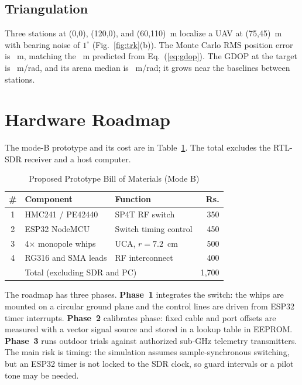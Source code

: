 \documentclass[conference]{IEEEtran}
\begin{document}
\subsection{Triangulation}
Three stations at (0,0), (120,0), and (60,110)~m localize a UAV at (75,45)~m with bearing noise of $1^\circ$ (Fig.~\ref{fig:trk}(b)). The Monte Carlo RMS position error is \trk~m, matching the \triTheory~m predicted from Eq.~(\ref{eq:gdop}). The GDOP at the target is \gdopT~m/rad, and its arena median is \gdopMed~m/rad; it grows near the baselines between stations.


\section{Hardware Roadmap}\label{sec:roadmap}
The mode-B prototype and its cost are in Table~\ref{tab:bom}. The total excludes the RTL-SDR receiver and a host computer.

\begin{table}[!t]
\caption{Proposed Prototype Bill of Materials (Mode B)}
\label{tab:bom}
\centering
\small
\begin{tabular}{@{}clp{3.4cm}r@{}}
\toprule
\# & Component & Function & Rs. \\
\midrule
1 & HMC241 / PE42440 & SP4T RF switch & 350 \\
2 & ESP32 NodeMCU & Switch timing control & 450 \\
3 & 4$\times$ monopole whips & UCA, $r=7.2$~cm & 500 \\
4 & RG316 and SMA leads & RF interconnect & 400 \\
\midrule
 & \multicolumn{2}{l}{Total (excluding SDR and PC)} & 1{,}700 \\
\bottomrule
\end{tabular}
\end{table}

The roadmap has three phases. \textbf{Phase~1} integrates the switch: the whips are mounted on a circular ground plane and the control lines are driven from ESP32 timer interrupts. \textbf{Phase~2} calibrates phase: fixed cable and port offsets are measured with a vector signal source and stored in a lookup table in EEPROM. \textbf{Phase~3} runs outdoor trials against authorized sub-GHz telemetry transmitters. The main risk is timing: the simulation assumes sample-synchronous switching, but an ESP32 timer is not locked to the SDR clock, so guard intervals or a pilot tone may be needed.
\end{document}
